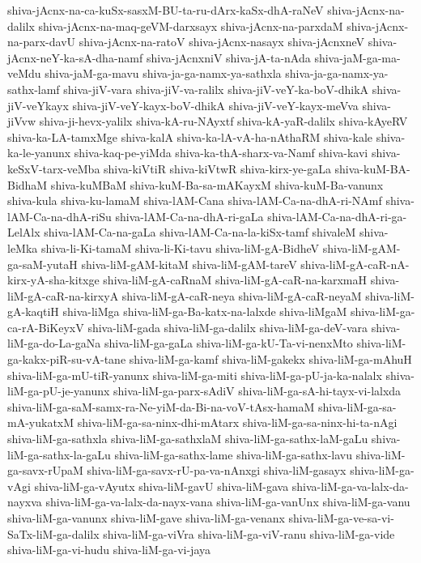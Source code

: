 {shiva-jAcnx-na-ca-kuSx-sasxM-BU-ta-ru-dArx-kaSx-dhA-raNeV
shiva-jAcnx-na-dalilx
shiva-jAcnx-na-maq-geVM-darxsayx
shiva-jAcnx-na-parxdaM
shiva-jAcnx-na-parx-davU
shiva-jAcnx-na-ratoV
shiva-jAcnx-nasayx
shiva-jAcnxneV
shiva-jAcnx-neY-ka-sA-dha-namf
shiva-jAcnxniV
shiva-jA-ta-nAda
shiva-jaM-ga-ma-veMdu
shiva-jaM-ga-mavu
shiva-ja-ga-namx-ya-sathxla
shiva-ja-ga-namx-ya-sathx-lamf
shiva-jiV-vara
shiva-jiV-va-ralilx
shiva-jiV-veY-ka-boV-dhikA
shiva-jiV-veYkayx
shiva-jiV-veY-kayx-boV-dhikA
shiva-jiV-veY-kayx-meVva
shiva-jiVvw
shiva-ji-hevx-yalilx
shiva-kA-ru-NAyxtf
shiva-kA-yaR-dalilx
shiva-kAyeRV
shiva-ka-LA-tamxMge
shiva-kalA
shiva-ka-lA-vA-ha-nAthaRM
shiva-kale
shiva-ka-le-yanunx
shiva-kaq-pe-yiMda
shiva-ka-thA-sharx-va-Namf
shiva-kavi
shiva-keSxV-tarx-veMba
shiva-kiVtiR
shiva-kiVtwR
shiva-kirx-ye-gaLa
shiva-kuM-BA-BidhaM
shiva-kuMBaM
shiva-kuM-Ba-sa-mAKayxM
shiva-kuM-Ba-vanunx
shiva-kula
shiva-ku-lamaM
shiva-lAM-Cana
shiva-lAM-Ca-na-dhA-ri-NAmf
shiva-lAM-Ca-na-dhA-riSu
shiva-lAM-Ca-na-dhA-ri-gaLa
shiva-lAM-Ca-na-dhA-ri-ga-LelAlx
shiva-lAM-Ca-na-gaLa
shiva-lAM-Ca-na-la-kiSx-tamf
shivaleM
shiva-leMka
shiva-li-Ki-tamaM
shiva-li-Ki-tavu
shiva-liM-gA-BidheV
shiva-liM-gAM-ga-saM-yutaH
shiva-liM-gAM-kitaM
shiva-liM-gAM-tareV
shiva-liM-gA-caR-nA-kirx-yA-sha-kitxge
shiva-liM-gA-caRnaM
shiva-liM-gA-caR-na-karxmaH
shiva-liM-gA-caR-na-kirxyA
shiva-liM-gA-caR-neya
shiva-liM-gA-caR-neyaM
shiva-liM-gA-kaqtiH
shiva-liMga
shiva-liM-ga-Ba-katx-na-lalxde
shiva-liMgaM
shiva-liM-ga-ca-rA-BiKeyxV
shiva-liM-gada
shiva-liM-ga-dalilx
shiva-liM-ga-deV-vara
shiva-liM-ga-do-La-gaNa
shiva-liM-ga-gaLa
shiva-liM-ga-kU-Ta-vi-nenxMto
shiva-liM-ga-kakx-piR-su-vA-tane
shiva-liM-ga-kamf
shiva-liM-gakekx
shiva-liM-ga-mAhuH
shiva-liM-ga-mU-tiR-yanunx
shiva-liM-ga-miti
shiva-liM-ga-pU-ja-ka-nalalx
shiva-liM-ga-pU-je-yanunx
shiva-liM-ga-parx-sAdiV
shiva-liM-ga-sA-hi-tayx-vi-lalxda
shiva-liM-ga-saM-samx-ra-Ne-yiM-da-Bi-na-voV-tAsx-hamaM
shiva-liM-ga-sa-mA-yukatxM
shiva-liM-ga-sa-ninx-dhi-mAtarx
shiva-liM-ga-sa-ninx-hi-ta-nAgi
shiva-liM-ga-sathxla
shiva-liM-ga-sathxlaM
shiva-liM-ga-sathx-laM-gaLu
shiva-liM-ga-sathx-la-gaLu
shiva-liM-ga-sathx-lame
shiva-liM-ga-sathx-lavu
shiva-liM-ga-savx-rUpaM
shiva-liM-ga-savx-rU-pa-va-nAnxgi
shiva-liM-gasayx
shiva-liM-ga-vAgi
shiva-liM-ga-vAyutx
shiva-liM-gavU
shiva-liM-gava
shiva-liM-ga-va-lalx-da-nayxva
shiva-liM-ga-va-lalx-da-nayx-vana
shiva-liM-ga-vanUnx
shiva-liM-ga-vanu
shiva-liM-ga-vanunx
shiva-liM-gave
shiva-liM-ga-venanx
shiva-liM-ga-ve-sa-vi-SaTx-liM-ga-dalilx
shiva-liM-ga-viVra
shiva-liM-ga-viV-ranu
shiva-liM-ga-vide
shiva-liM-ga-vi-hudu
shiva-liM-ga-vi-jaya
}
